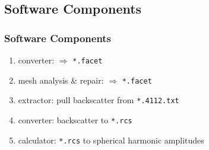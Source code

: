 \subsection{Software Components}
\begin{frame}\frametitle{Software Components}
\begin{enumerate}
	\item converter: \obj $\Rightarrow$ \texttt{*.facet}
	\item mesh analysis \& repair: \obj $\Rightarrow$ \texttt{*.facet}
	\item extractor: pull backscatter from \texttt{*.4112.txt}
	\item converter: backscatter to \texttt{*.rcs}
	\item calculator: \texttt{*.rcs} to spherical harmonic amplitudes
\end{enumerate}
\end{frame}




\endinput  %
